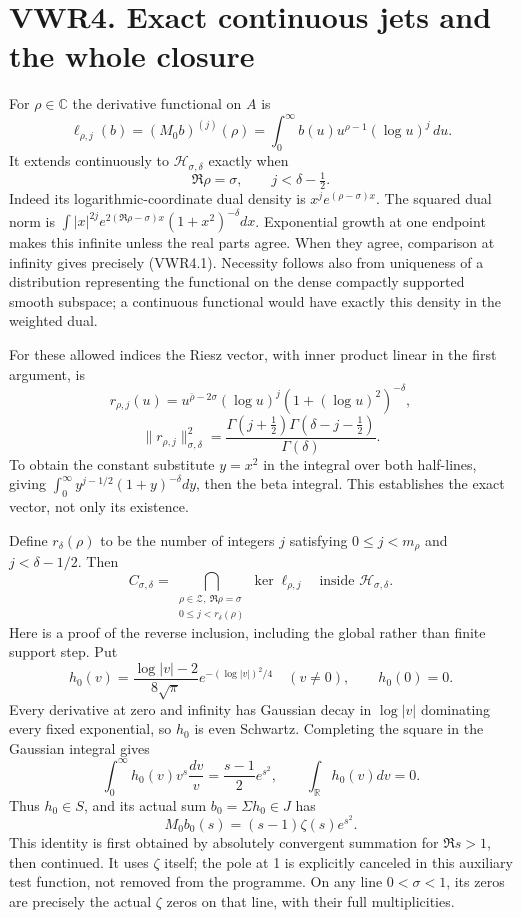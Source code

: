 \section{VWR4. Exact continuous jets and the whole
closure}\label{vwr4.-exact-continuous-jets-and-the-whole-closure}

For \(\rho\in\mathbb C\) the derivative functional on \(A\) is \[
\ell_{\rho,j}(b)=(M_0b)^{(j)}(\rho)
=\int_0^\infty b(u)u^{\rho-1}(\log u)^j\,du.
\] It extends continuously to \(\mathcal H_{\sigma,\delta}\) exactly
when \[
\Re\rho=\sigma,\qquad j<\delta-\tfrac12.
\tag{VWR4.1}
\] Indeed its logarithmic-coordinate dual density is
\(x^je^{(\rho-\sigma)x}\). The squared dual norm is
\(\int |x|^{2j}e^{2(\Re\rho-\sigma)x}(1+x^2)^{-\delta}dx\). Exponential
growth at one endpoint makes this infinite unless the real parts agree.
When they agree, comparison at infinity gives precisely (VWR4.1).
Necessity follows also from uniqueness of a distribution representing
the functional on the dense compactly supported smooth subspace; a
continuous functional would have exactly this density in the weighted
dual.

For these allowed indices the Riesz vector, with inner product linear in
the first argument, is \[
r_{\rho,j}(u)=u^{\bar\rho-2\sigma}(\log u)^j(1+(\log u)^2)^{-\delta},
\] \[
\|r_{\rho,j}\|_{\sigma,\delta}^2
=\frac{\Gamma(j+\tfrac12)\Gamma(\delta-j-\tfrac12)}{\Gamma(\delta)}.
\tag{VWR4.2}
\] To obtain the constant substitute \(y=x^2\) in the integral over both
half-lines, giving \(\int_0^\infty y^{j-1/2}(1+y)^{-\delta}dy\), then
the beta integral. This establishes the exact vector, not only its
existence.

Define \(r_\delta(\rho)\) to be the number of integers \(j\) satisfying
\(0\le j<m_\rho\) and \(j<\delta-1/2\). Then \[
C_{\sigma,\delta}
=\bigcap_{\substack{\rho\in\mathscr Z,\ \Re\rho=\sigma\\0\le j<r_\delta(\rho)}}\ker\ell_{\rho,j}
\quad\text{inside }\mathcal H_{\sigma,\delta}.
\tag{VWR4.3}
\] Here is a proof of the reverse inclusion, including the global rather
than finite support step. Put \[
h_0(v)=\frac{\log|v|-2}{8\sqrt\pi}e^{-(\log|v|)^2/4}\quad(v\ne0),\qquad h_0(0)=0.
\] Every derivative at zero and infinity has Gaussian decay in
\(\log|v|\) dominating every fixed exponential, so \(h_0\) is even
Schwartz. Completing the square in the Gaussian integral gives \[
\int_0^\infty h_0(v)v^s\frac{dv}{v}=\frac{s-1}{2}e^{s^2},\qquad
\int_{\mathbb R}h_0(v)dv=0.
\] Thus \(h_0\in S\), and its actual sum \(b_0=\Sigma h_0\in J\) has \[
M_0b_0(s)=(s-1)\zeta(s)e^{s^2}.
\tag{VWR4.4}
\] This identity is first obtained by absolutely convergent summation
for \(\Re s>1\), then continued. It uses \(\zeta\) itself; the pole at 1
is explicitly canceled in this auxiliary test function, not removed from
the programme. On any line \(0<\sigma<1\), its zeros are precisely the
actual \(\zeta\) zeros on that line, with their full multiplicities.


